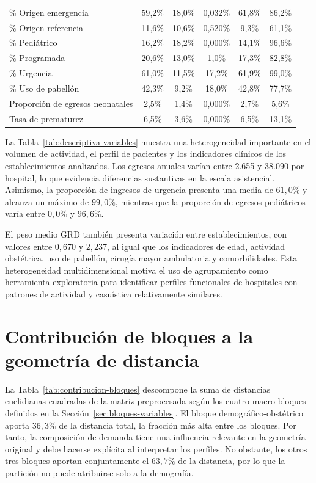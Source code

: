 \begin{table}[htbp]
\begin{tabular}{l c c c c c}
\% Origen emergencia & 59{,}2\% & 18{,}0\% & 0{,}032\% & 61{,}8\% & 86{,}2\% \\
\% Origen referencia & 11{,}6\% & 10{,}6\% & 0{,}520\% & 9{,}3\% & 61{,}1\% \\
\% Pediátrico & 16{,}2\% & 18{,}2\% & 0{,}000\% & 14{,}1\% & 96{,}6\% \\
\% Programada & 20{,}6\% & 13{,}0\% & 1{,}0\% & 17{,}3\% & 82{,}8\% \\
\% Urgencia & 61{,}0\% & 11{,}5\% & 17{,}2\% & 61{,}9\% & 99{,}0\% \\
\% Uso de pabellón & 42{,}3\% & 9{,}2\% & 18{,}0\% & 42{,}8\% & 77{,}7\% \\
Proporción de egresos neonatales & 2{,}5\% & 1{,}4\% & 0{,}000\% & 2{,}7\% & 5{,}6\% \\
Tasa de prematurez & 6{,}5\% & 3{,}6\% & 0{,}000\% & 6{,}5\% & 13{,}1\% \\
\bottomrule
\end{tabular}
\end{table}

La Tabla~\ref{tab:descriptiva-variables} muestra una heterogeneidad importante
en el volumen de actividad, el perfil de pacientes y los indicadores clínicos de
los establecimientos analizados. Los egresos anuales varían entre 2.655 y 38.090
por hospital, lo que evidencia diferencias sustantivas en la escala asistencial.
Asimismo, la proporción de ingresos de urgencia presenta una media de
$61{,}0\%$ y alcanza un máximo de $99{,}0\%$, mientras que la proporción de
egresos pediátricos varía entre $0{,}0\%$ y $96{,}6\%$.

El peso medio GRD también presenta variación entre establecimientos, con valores
entre $0{,}670$ y $2{,}237$, al igual que los indicadores de edad, actividad
obstétrica, uso de pabellón, cirugía mayor ambulatoria y comorbilidades. Esta
heterogeneidad multidimensional motiva el uso de agrupamiento como herramienta
exploratoria para identificar perfiles funcionales de hospitales con patrones de
actividad y casuística relativamente similares.

\section{Contribución de bloques a la geometría de distancia}
\label{sec:res-bloques}

La Tabla~\ref{tab:contribucion-bloques} descompone la suma de distancias
euclidianas cuadradas de la matriz preprocesada según los cuatro macro-bloques
definidos en la Sección~\ref{sec:bloques-variables}. El bloque
demográfico-obstétrico aporta $36{,}3\%$ de la distancia total, la fracción más
alta entre los bloques. Por tanto, la composición de demanda tiene una influencia
relevante en la geometría original y debe hacerse explícita al interpretar los
perfiles. No obstante, los otros tres bloques aportan conjuntamente el
$63{,}7\%$ de la distancia, por lo que la partición no puede atribuirse solo a
la demografía.

